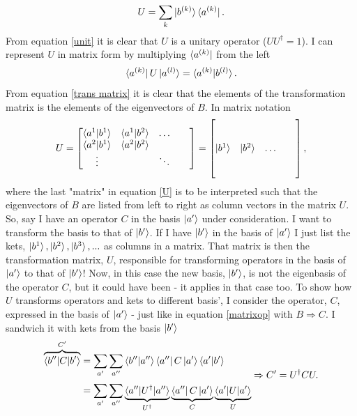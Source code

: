 \begin{equation}
	U=\sum_{k}^{}\ket{b^{(k)}}\bra{a^{(k)}}.
	\label{unit}
\end{equation} 
From equation \eqref{unit} it is clear that $U$ is a unitary operator ($UU^\dagger=1$). I can represent $U$ in matrix form by multiplying $\bra{a^{(k)}}$ from the left
\begin{equation}
	\bra{a^{(k)}}U\ket{a^{(l)}}=\braket{a^{(k)}|b^{(l)}}.
	\label{trans matrix}
\end{equation} 
From equation \eqref{trans matrix} it is clear that the elements of the transformation matrix is the elements of the eigenvectors of $B$. In matrix notation
\begin{equation}
	U=
	\begin{bmatrix}
		\braket{a^{1}|b^{1}} & \braket{a^{1}|b^{2}}&\dots\\
		\braket{a^{2}|b^{1}} & \braket{a^{2}|b^{2}} &&&\\
		\vdots& &\ddots \\
	\end{bmatrix}=
	\begin{bmatrix}
		&&&&\\
		&&&&\\
		\ket{b^{1}} & \ket{b^{2}}&\dots\\
		&&&&\\
		&&&&\\
	\end{bmatrix},
	\label{U}
\end{equation} 
where the last "matrix" in equation \eqref{U} is to be interpreted such that the eigenvectors of $B$ are listed from left to right as column vectors in the matrix $U$. So, say I have an operator $C$ in the basis $\ket{a'}$ under consideration. I want to transform the basis to that of $\ket{b'}$. If I have $\ket{b'}$ in the basis of $\ket{a'}$ I just list the kets, $\ket{b^1}, \ket{b^2}, \ket{b^3},...$ as columns in a matrix. That matrix is then the transformation matrix, $U$, responsible for transforming operators in the basis of $\ket{a'}$ to that of $\ket{b'}$! Now, in this case the new basis, $\ket{b'}$, is not the eigenbasis of the operator $C$, but it could have been - it applies in that case too.\newline 
To show how $U$ transforms operators and kets to different basis', I consider the operator, $C$, expressed in the basis of $\ket{a'}$ - just like in equation \eqref{matrixop} with $B\Rightarrow C$. I sandwich it with kets from the basis $\ket{b'}$
\begin{equation}
	\begin{split}
		\overbrace{\braket{b''|C|b'}}^{C'}&
		=\sum_{a'}^{}\sum_{a''}^{}\braket{b''|a''}\bra{a''}C\ket{a'}\braket{a'|b'}\\
		&=\sum_{a'}^{}\sum_{a''}^{}\underbrace{\braket{a''|U^\dagger|a''}}_{U^\dagger}\underbrace{\bra{a''}C\ket{a'}}_{C}\underbrace{\braket{a'|U|a'}}_{U}
	\end{split}\Rightarrow  C'=U^\dagger CU.
	\label{matrixop3}
\end{equation} 
